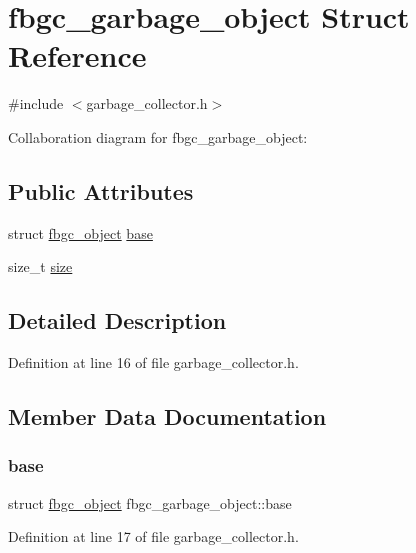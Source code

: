 \hypertarget{structfbgc__garbage__object}{}\section{fbgc\+\_\+garbage\+\_\+object Struct Reference}
\label{structfbgc__garbage__object}


{\ttfamily \#include $<$garbage\+\_\+collector.\+h$>$}



Collaboration diagram for fbgc\+\_\+garbage\+\_\+object\+:
\subsection*{Public Attributes}
\begin{DoxyCompactItemize}
\item 
struct \hyperlink{structfbgc__object}{fbgc\+\_\+object} \hyperlink{structfbgc__garbage__object_a98994ec1253809f7e06df7fd2daddf16}{base}
\item 
size\+\_\+t \hyperlink{structfbgc__garbage__object_a8f87f80616e58f0aa24b659e94be483c}{size}
\end{DoxyCompactItemize}


\subsection{Detailed Description}


Definition at line 16 of file garbage\+\_\+collector.\+h.



\subsection{Member Data Documentation}
\mbox{\label{structfbgc__garbage__object_a98994ec1253809f7e06df7fd2daddf16}} 
\subsubsection{\texorpdfstring{base}{base}}
{\footnotesize\ttfamily struct \hyperlink{structfbgc__object}{fbgc\+\_\+object} fbgc\+\_\+garbage\+\_\+object\+::base}



Definition at line 17 of file garbage\+\_\+collector.\+h.

